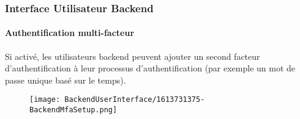 %

\begin{frame}[fragile]
	\frametitle{Interface Utilisateur Backend}
	\framesubtitle{Authentification multi-facteur}

	Si activé, les utilisateurs backend peuvent ajouter un second facteur d'authentification
	à leur processus d'authentification (par exemple un mot de passe unique basé sur le temps).

	\begin{figure}
		\texttt{[image: BackendUserInterface/1613731375-BackendMfaSetup.png]}
	\end{figure}

\end{frame}

